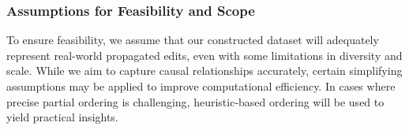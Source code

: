 \subsubsection{Assumptions for Feasibility and Scope}

To ensure feasibility, we assume that our constructed dataset will adequately represent real-world propagated edits, even with some limitations in diversity and scale. While we aim to capture causal relationships accurately, certain simplifying assumptions may be applied to improve computational efficiency. In cases where precise partial ordering is challenging, heuristic-based ordering will be used to yield practical insights.
